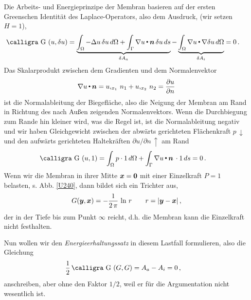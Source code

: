 {{{{{Die Arbeits- und Energieprinzipe der Membran basieren auf der ersten Greenschen Identit\"{a}t des Laplace-Operators,  also dem Ausdruck, (wir setzen $H = 1$),
\begin{align}
\text{\normalfont\calligra G\,\,}(u, \delta u) &= \underbrace{\int_{\Omega} -\Delta u\,\delta u\,d\Omega + \int_{\Gamma} \nabla u \dotprod \vek n\,\delta u\,ds}_{\delta A_a} - \underbrace{\int_{\Omega} \nabla u \dotprod \nabla \delta u \,d\Omega}_{\delta A_i} = 0\,.
\end{align}
Das Skalarprodukt zwischen dem Gradienten und dem Normalenvektor
\begin{align}
\nabla u {\,\scriptscriptstyle \stackrel{\bullet}{{}}}\, \mbox{\boldmath $n$} = u,_{x_1}\,n_1 + u,_{x_2}\,n_2 = \frac{\partial u}{\partial n}
\end{align}
ist die Normalableitung der Biegefl\"{a}che, also die Neigung der Membran am Rand in Richtung des nach Au{\ss}en zeigenden Normalenvektors. Wenn die Durchbiegung zum Rande hin kleiner wird, was die Regel ist, ist die Normalableitung negativ und wir haben Gleichgewicht zwischen der abw\"{a}rts gerichteten Fl\"{a}chenkraft $p\,\downarrow$ und den aufw\"{a}rts gerichteten Haltekr\"{a}ften $\partial u/\partial n\,\uparrow$ am Rand
\begin{align}
\text{\normalfont\calligra G\,\,}(u, 1) &= \int_{\Omega} p \cdot 1\,d\Omega + \int_{\Gamma} \nabla u \dotprod \vek n\,\cdot 1 \,ds = 0\,.
\end{align}
Wenn wir die Membran in ihrer Mitte $\mbox{\boldmath $x$} = \mbox{\boldmath $0$}$ mit einer Einzelkraft $P=1$ belasten, s. Abb. \ref{U240}, dann bildet sich ein Trichter aus, \begin{align} \label{Eq103}
G(\mbox{\boldmath $y$},\mbox{\boldmath $x$}) = -\frac{1}{2\,\pi}\,\ln\,r \qquad r = |\mbox{\boldmath $y$} - \mbox{\boldmath $x$}|\,,
\end{align}
der in der Tiefe bis zum Punkt $\infty$ reicht, d.h. die Membran kann die Einzelkraft nicht festhalten.

Nun wollen wir den {\em Energieerhaltungssatz\/} in diesem Lastfall formulieren, also die Gleichung
\begin{align}
\frac{1}{2}\, \text{\normalfont\calligra G\,\,}(G, G) &= A_a - A_i = 0\,,
\end{align}
anschreiben, aber ohne den Faktor $1/2$, weil er f\"{u}r die Argumentation nicht wesentlich ist.

}}}}}
